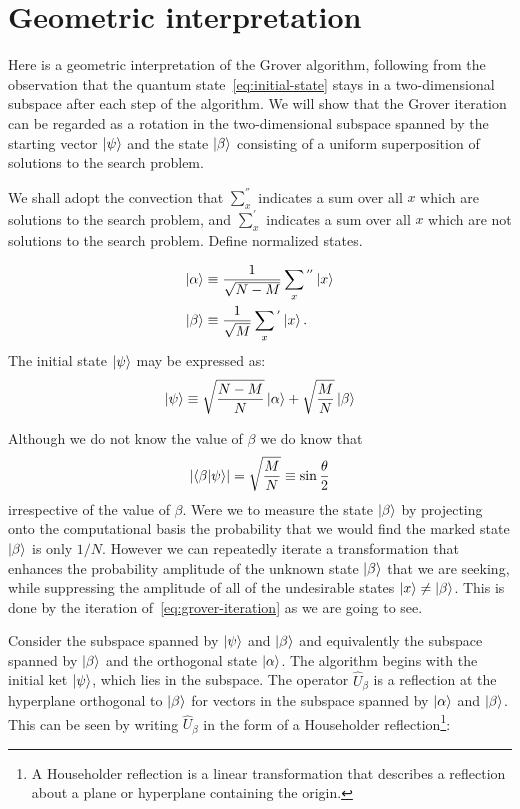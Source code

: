 \section{Geometric interpretation}\label{sec:geometric-interpretation}
Here is a geometric interpretation of the Grover algorithm, following from the observation that the quantum state~\ref{eq:initial-state} stays in a two-dimensional subspace after each step of the algorithm. We will show that the Grover iteration can be regarded as a rotation in the two-dimensional subspace spanned by the starting vector $\ket{\psi}$ and the state $\ket{\beta}$ consisting of a uniform superposition of solutions to the search problem. 

We shall adopt the convection that $\sum_{x}^{''}$ indicates a sum over all $x$ which are solutions to the search problem, and $\sum_{x}^{'}$ indicates a sum over all $x$ which are not solutions to the search problem. Define normalized states.

\begin{equation*}
\begin{split}
 \ket{\alpha} &\equiv \frac{1}{\sqrt{N-M}} \sum_{x}{}^{''} \ket{x} \\
 \ket{\beta} &\equiv \frac{1}{\sqrt{M}} \sum_{x}{}^{'} \ket{x}.
\end{split}
\end{equation*}
The initial state $\ket{\psi}$ may be expressed as:
\begin{equation*}
    \ket{\psi} \equiv \sqrt{\frac{N-M}{N}} \ket{\alpha} + \sqrt{\frac{M}{N}} \ket{\beta}
\end{equation*}

Although we do not know the value of $\beta$ we do know that 
\begin{equation}
    \lvert\braket{\beta | \psi}\rvert = \sqrt{\frac{M}{N}} \equiv \sin{\frac{\theta}{2}}
\end{equation}
irrespective of the value of $\beta$. Were we to measure the state $\ket{\beta}$ by projecting onto the computational basis the probability that we would find the marked state $\ket{\beta}$ is only $1/N$.  However we can repeatedly iterate a transformation that enhances the probability amplitude of the unknown state $\ket{\beta}$ that we are seeking, while suppressing the amplitude of all of the
undesirable states $\ket{x} \neq \ket{\beta}$. This is done by the iteration of~\ref{eq:grover-iteration} as we are going to see.

Consider the subspace spanned by $\ket{\psi}$ and $\ket{\beta}$ and equivalently the subspace spanned by $\ket{\beta}$ and the orthogonal state $\ket{\alpha}$.
The algorithm begins with the initial ket $\ket{\psi}$, which lies in the subspace. The operator $\hat{U}_\beta$ is a reflection at the hyperplane orthogonal to $\ket{\beta}$ for vectors in the subspace spanned by $\ket{\alpha}$ and $\ket{\beta}$. This can be seen by writing $\hat{U}_\beta$ in the form of a Householder reflection\footnote{A Householder reflection is a linear transformation that describes a reflection about a plane or hyperplane containing the origin.}:

